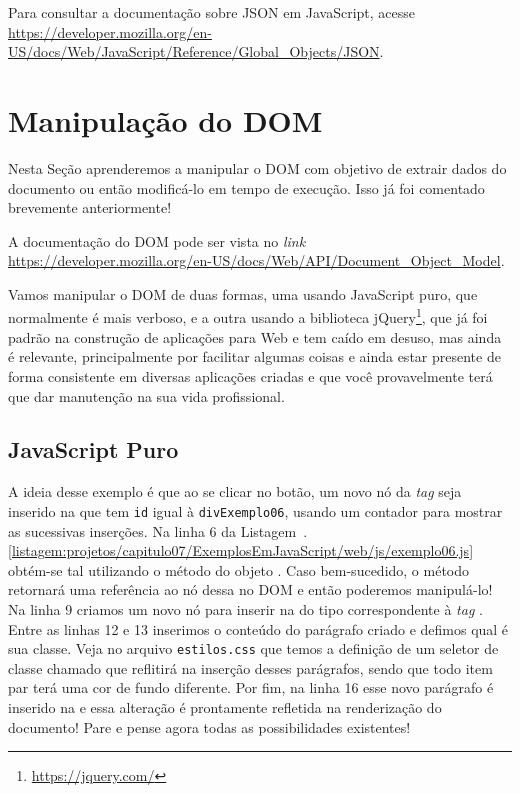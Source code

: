 \begin{saibaMais}
    Para consultar a documentação sobre JSON em JavaScript, acesse \url{https://developer.mozilla.org/en-US/docs/Web/JavaScript/Reference/Global_Objects/JSON}.
\end{saibaMais}



\section{Manipulação do DOM}

Nesta Seção aprenderemos a manipular o DOM com objetivo de extrair dados do documento ou então modificá-lo em tempo de execução. Isso já foi comentado brevemente anteriormente!

\begin{saibaMais}
    A documentação do DOM pode ser vista no \textit{link} \url{https://developer.mozilla.org/en-US/docs/Web/API/Document_Object_Model}.
\end{saibaMais}

Vamos manipular o DOM de duas formas, uma usando JavaScript puro, que normalmente é mais verboso, e a outra usando a biblioteca jQuery\footnote{\url{https://jquery.com/}}, que já foi padrão na construção de aplicações para Web e tem caído em desuso, mas ainda é relevante, principalmente por facilitar algumas coisas e ainda estar presente de forma consistente em diversas aplicações criadas e que você provavelmente terá que dar manutenção na sua vida profissional.


\subsection{JavaScript Puro}

A ideia desse exemplo é que ao se clicar no botão, um novo nó da \textit{tag}  seja inserido na  que tem \texttt{id} igual à \texttt{divExemplo06}, usando um contador para mostrar as sucessivas inserções. Na linha 6 da Listagem~\thechapter.\ref{listagem:projetos/capitulo07/ExemplosEmJavaScript/web/js/exemplo06.js} obtém-se tal  utilizando o método  do objeto . Caso bem-sucedido, o método retornará uma referência ao nó dessa  no DOM e então poderemos manipulá-lo! Na linha 9 criamos um novo nó para inserir na  do tipo correspondente à \textit{tag} . Entre as linhas 12 e 13 inserimos o conteúdo do parágrafo criado e defimos qual é sua classe. Veja no arquivo \texttt{estilos.css} que temos a definição de um seletor de classe chamado  que reflitirá na inserção desses parágrafos, sendo que todo item par terá uma cor de fundo diferente. Por fim, na linha 16 esse novo parágrafo é inserido na  e essa alteração é prontamente refletida na renderização do documento! Pare e pense agora todas as possibilidades existentes!


